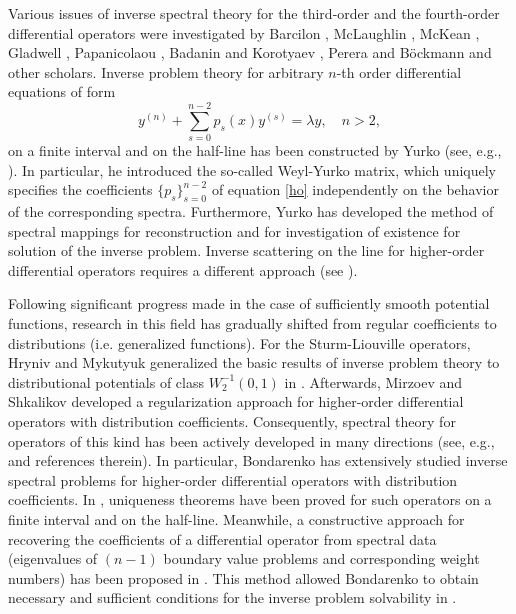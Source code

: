 \documentclass[reqno,12pt,centertags]{amsart}
\numberwithin{equation}{section}
\theoremstyle{definition}
\begin{document}
Various issues of inverse spectral theory for the third-order and the fourth-order differential operators were investigated by Barcilon \cite{Bar1, Bar2}, McLaughlin \cite{Mc1, Mc2, Mc3}, McKean \cite{McK81}, Gladwell \cite{Gla}, 
Papanicolaou \cite{Pap04}, Badanin and Korotyaev \cite{Bad}, Perera and B\"ockmann \cite{PB20} and other scholars.
Inverse problem theory for arbitrary $n$-th order differential equations of form
\begin{equation} \label{ho}
y^{(n)} + \sum_{s = 0}^{n-2} p_s(x) y^{(s)} = \lambda y, \quad n > 2,
\end{equation}
on a finite interval and on the half-line has been constructed by Yurko (see, e.g., \cite{Yur, Yur1, Yur2}). In particular, he introduced the so-called Weyl-Yurko matrix, which uniquely specifies the coefficients $\{ p_s\}_{s = 0}^{n-2}$ of equation \eqref{ho} independently on the behavior of the corresponding spectra. Furthermore, Yurko has developed the method of spectral mappings for reconstruction and for investigation of existence for solution of the inverse problem. Inverse scattering on the line for higher-order differential operators requires a different approach (see \cite{Ba}).

Following significant progress made in the case of sufficiently smooth potential functions, research in this field has gradually shifted from regular coefficients to distributions (i.e. generalized functions). For the Sturm-Liouville operators, Hryniv and Mykutyuk generalized the basic results of inverse problem theory to distributional
potentials of class $W_2^{-1}(0,1)$ in \cite{Hry1,Hry2,Hry3}.  Afterwards, Mirzoev and Shkalikov \cite{Mir1,Mir2} developed a regularization approach for higher-order differential operators with distribution coefficients. Consequently, spectral theory for operators of this kind has been actively developed in many directions (see, e.g., \cite{KMS23} and references therein).
In particular, Bondarenko has extensively studied inverse spectral problems for higher-order differential operators with distribution coefficients. In \cite{Bon2, Bon3}, uniqueness theorems have been proved for such operators on a finite interval and on the half-line. Meanwhile, a constructive approach for recovering the coefficients of a differential operator from spectral data (eigenvalues of $(n-1)$ boundary value problems and corresponding weight numbers) has been proposed in \cite{Bon1}. This method allowed Bondarenko to obtain necessary and sufficient conditions for the inverse problem solvability in \cite{Bon7}.
\end{document}
